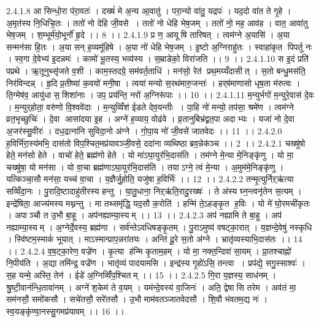 2.4.1.8
आ सिन्धो॒रा प॑रा॒वतः॑ । दख्षं॑ मे अ॒न्य आ॒वातु॑ । परा॒न्यो वा॑तु॒ यद्रपः॑ । यद॒दो वा॑त ते गृ॒हे । अ॒मृत॑स्य नि॒धिऱ्हि॒तः । ततो॑ नो देहि जी॒वसे । ततो॑ नो धेहि भेष॒जम् । ततो॑ नो॒ मह॒ आव॑ह । वात॒ आवा॑तु भेष॒जम् । श॒म्भूर्म॑यो॒भूर्नो॑ हृ॒दे ।। 8 ।।
2.4.1.9
प्र ण॒ आयू॑षि तारिषत् । त्वम॑ग्ने अ॒यासि॑ । अ॒या सन्मन॑सा हि॒तः । अ॒या सन् ह॒व्यमू॑हिषे । अ॒या नो॑ धेहि भेष॒जम् । इ॒ष्टो अ॒ग्निराहु॑तः । स्वाहा॑कृत पिपर्तु नः । स्व॒गा दे॒वेभ्य॑ इ॒दन्नमः॑ । कामो॑ भू॒तस्य॒ भव्य॑स्य । स॒म्राडेको॒ विरा॑जति ।। 9 ।।
2.4.1.10
स इ॒दं प्रति॑ पप्रथे । ऋ॒तूनुथ्सृ॑जते व॒शी । काम॒स्तदग्रे॒ सम॑वर्त॒ताधि॑ । मन॑सो॒ रेत॑ प्रथ॒मय्यँदासीत् । स॒तो बन्धु॒मस॑ति॒ निर॑विन्दन्न् । हृ॒दि प्र॒तीष्या॑ क॒वयो॑ मनी॒षा । त्वया॑ मन्यो स॒रथ॑मारु॒जन्तः॑ । हर्‌ष॑माणासो धृष॒ता म॑रुत्वः । ति॒ग्मेष॑व॒ आयु॑धा स॒॒शिशा॑नाः । उप॒ प्रय॑न्ति॒ नरो॑ अ॒ग्निरू॑पाः ।। 10 ।।
2.4.1.11
म॒न्युर्भगो॑ म॒न्युरे॒वास॑ दे॒वः । म॒न्युर्‌होता॒ वरु॑णो वि॒श्ववे॑दाः । म॒न्युव्विँश॑ ईडते देव॒यन्तीः । पा॒हि नो॑ मन्यो॒ तप॑सा॒ श्रमे॑ण । त्वम॑ग्ने व्रत॒भृच्छुचिः॑ । दे॒वा आसा॑दया इ॒ह । अग्ने॑ ह॒व्याय॒ वोढ॑वे । व्र॒तानुबिभ्र॑द्व्रत॒पा अदाभ्यः । यजा॑ नो दे॒वा अ॒जर॑स्सु॒वीरः॑ । दध॒द्रत्ना॑नि सुविदा॒नो अ॑ग्ने । गो॒पा॒य नो॑ जी॒वसे॑ जातवेदः ।। 11 ।।
2.4.2.0
ह॒विर्भि॑रा॒स्य॑मभि॒ दास॑तो विप॒श्चित॒मप्र॑यावञ्जी॒वसे॒ ददा॑ना व्यथिष्ठा ब्रव॒न्नेक॑ञ्च ।। 2 ।।
2.4.2.1
चख्षु॑षो हेते॒ मन॑सो हेते । वाचो॑ हेते॒ ब्रह्म॑णो हेते । यो मा॑ऽघा॒युर॑भि॒दास॑ति । तम॑ग्ने मे॒न्या मे॒निङ्कृ॑णु । यो मा॒ चख्षु॑षा॒ यो मन॑सा । यो वा॒चा ब्रह्म॑णाऽघा॒युर॑भि॒दास॑ति । तयाऽग्ने॒ त्वं मे॒न्या । अ॒मुम॑मे॒निङ्कृ॑णु । यत्किञ्चा॒सौ मन॑सा॒ यच्च॑ वा॒चा । य॒ज्ञैर्जु॒होति॒ यजु॑षा ह॒विर्भिः॑ ।। 12 ।।
2.4.2.2
तन्मृ॒त्युर्निऱ्ऋ॑त्या सव्विँदा॒नः । पु॒रादि॒ष्टादाहु॑तीरस्य हन्तु । या॒तु॒धाना॒ निऱ्ऋ॑ति॒रादु॒रख्षः॑ । ते अ॑स्य घ्न॒न्त्वनृ॑तेन स॒त्यम् । इन्द्रे॑षिता॒ आज्य॑मस्य मथ्नन्तु । मा तथ्समृ॑द्धि॒ यद॒सौ क॒रोति॑ । हन्मि॑ ते॒ऽहङ्कृ॒त ह॒विः । यो मे॑ घो॒रमची॑कृतः । अपाञ्चौ त उ॒भौ बा॒हू । अप॑नह्याम्या॒स्यम् ।। 13 ।।
2.4.2.3
अप॑ नह्यामि ते बा॒हू । अप॑ नह्याम्या॒स्यम् । अ॒ग्नेर्दे॒वस्य॒ ब्रह्म॑णा । सर्व॑न्तेऽवधिषङ्कृ॒तम् । पु॒राऽमुष्य॑ वषट्का॒रात् । य॒ज्ञन्दे॒वेषु॑ नस्कृधि । स्वि॑ष्टम॒स्माकं॑ भूयात् । माऽस्मान्प्राप॒न्नरा॑तयः । अन्ति॑ दू॒रे स॒तो अ॑ग्ने । भ्रातृ॑व्यस्याभि॒दास॑तः ।। 14 ।।
2.4.2.4
व॒ष॒ट्का॒रेण॒ वज्रे॑ण । कृ॒त्या ह॑न्मि कृ॒ताम॒हम् । यो मा॒ नक्त॒न्दिवा॑ सा॒यम् । प्रा॒तश्चाह्नो॑ नि॒पीय॑ति । अ॒द्या तमि॑न्द्र॒ वज्रे॑ण । भातृ॑व्यं पादयामसि । इन्द्र॑स्य गृ॒हो॑ऽसि॒ तन्त्वा । प्रप॑द्ये॒ सगु॒स्साश्वः॑ । स॒ह यन्मे॒ अस्ति॒ तेन॑ । ईडे॑ अ॒ग्निव्विँ॑प॒श्चितम् ।। 15 ।।
2.4.2.5
गि॒रा य॒ज्ञस्य॒ साध॑नम् । श्रु॒ष्टी॒वान॑न्धि॒तावा॑नम् । अग्ने॑ श॒केम॑ ते व॒यम् । यम॑न्दे॒वस्य॑ वा॒जिनः॑ । अति॒ द्वेषा॑सि तरेम । अव॑तं मा॒ सम॑नसौ॒ समो॑कसौ । सचे॑तसौ॒ सरे॑तसौ । उ॒भौ माम॑वतञ्जातवेदसौ । शि॒वौ भ॑वतम॒द्य नः॑ । स्व॒यङ्कृ॑ण्वा॒नस्सु॒गमप्र॑यावम् ।। 16 ।।
